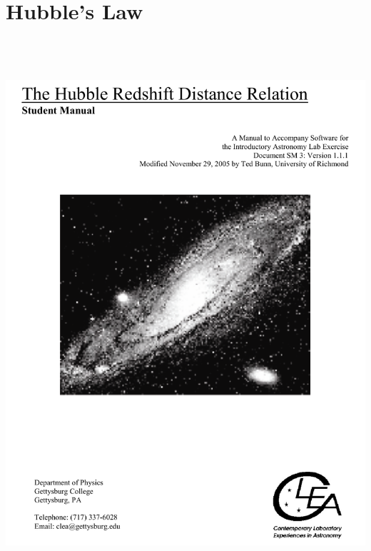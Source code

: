 \section{Hubble's Law}

\makelabheader

\bigskip\bigskip

\includegraphics[height=8in]{hubble/hubble1.pdf}
\vfil\eject

